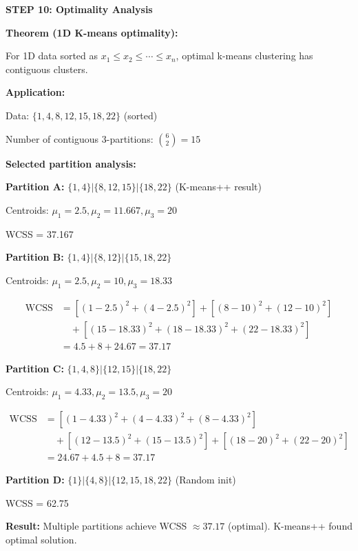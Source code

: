 \documentclass[12pt]{article}
\begin{document}
\begin{solution}
\textbf{STEP 10: Optimality Analysis}

\textbf{Theorem (1D K-means optimality):}

For 1D data sorted as $x_1 \leq x_2 \leq \cdots \leq x_n$, optimal k-means clustering has contiguous clusters.

\textbf{Application:}

Data: $\{1, 4, 8, 12, 15, 18, 22\}$ (sorted)

Number of contiguous 3-partitions: $\binom{6}{2} = 15$

\textbf{Selected partition analysis:}

\textbf{Partition A:} $\{1,4\} | \{8,12,15\} | \{18,22\}$ (K-means++ result)

Centroids: $\mu_1=2.5, \mu_2=11.667, \mu_3=20$

WCSS = 37.167

\textbf{Partition B:} $\{1,4\} | \{8,12\} | \{15,18,22\}$

Centroids: $\mu_1=2.5, \mu_2=10, \mu_3=18.33$

\begin{align*}
\text{WCSS} &= [(1-2.5)^2 + (4-2.5)^2] + [(8-10)^2 + (12-10)^2] \\
&\quad + [(15-18.33)^2 + (18-18.33)^2 + (22-18.33)^2] \\
&= 4.5 + 8 + 24.67 = 37.17
\end{align*}

\textbf{Partition C:} $\{1,4,8\} | \{12,15\} | \{18,22\}$

Centroids: $\mu_1=4.33, \mu_2=13.5, \mu_3=20$

\begin{align*}
\text{WCSS} &= [(1-4.33)^2 + (4-4.33)^2 + (8-4.33)^2] \\
&\quad + [(12-13.5)^2 + (15-13.5)^2] + [(18-20)^2 + (22-20)^2] \\
&= 24.67 + 4.5 + 8 = 37.17
\end{align*}

\textbf{Partition D:} $\{1\} | \{4,8\} | \{12,15,18,22\}$ (Random init)

WCSS = 62.75

\textbf{Result:} Multiple partitions achieve WCSS $\approx 37.17$ (optimal). K-means++ found optimal solution.

\end{solution}
\end{document}
